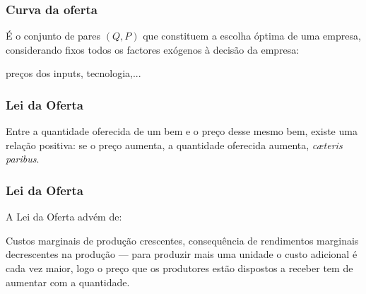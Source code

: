 \begin{frame}
	\frametitle{Curva da oferta}
	\'E o conjunto de pares $(Q,P)$ que constituem a escolha \'optima de uma empresa, considerando fixos todos os factores ex\'ogenos \`a decis\~ao da empresa:

	\vspace{0.5cm}

	pre\c cos dos inputs, tecnologia,...
\end{frame}

\begin{frame}
	\frametitle{Lei da Oferta}
	Entre a quantidade oferecida de um bem e o pre\c co desse mesmo bem, existe uma rela\c c\~ao positiva: se o pre\c co aumenta, a quantidade oferecida aumenta, \emph{c\ae teris paribus}.
\end{frame}

\begin{frame}
	\frametitle{Lei da Oferta}
	A Lei da Oferta adv\'em de:

	\vspace{0.4cm}

		Custos marginais de produ\c c\~ao crescentes, consequ\^encia de rendimentos marginais decrescentes na produ\c c\~ao --- para produzir mais uma unidade o custo adicional \'e cada vez maior, logo o pre\c co que os produtores est\~ao dispostos a receber tem de aumentar com a quantidade.

\end{frame}

